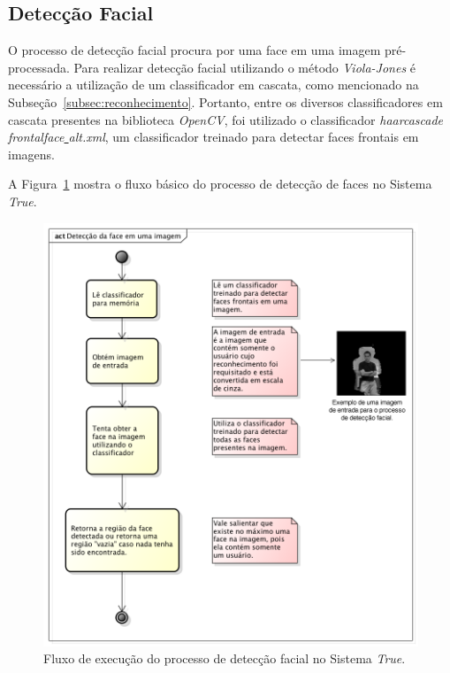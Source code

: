 	\subsection{Detecção Facial}

		O processo de detecção facial procura por uma face em uma imagem pré-processada. Para realizar detecção facial utilizando o método \textit{Viola-Jones} é necessário a utilização de um classificador em cascata, como mencionado na Subseção~\ref{subsec:reconhecimento}. Portanto, entre os diversos classificadores em cascata presentes na biblioteca \textit{OpenCV}, foi utilizado o classificador \textit{haarcascade\underline{ }frontalface\underline{ }alt.xml}, um classificador treinado para detectar faces frontais em imagens.

		A Figura~\ref{fig:diagrama-deteccao} mostra o fluxo básico do processo de detecção de faces no Sistema \textit{True}.

			\begin{figure}[H]
			\begin{center}
				\includegraphics[scale=0.7]{figuras/4.ProblemaEProposta/diagrama-detectar-face.png}
			\end{center}
			\caption{Fluxo de execução do processo de detecção facial no Sistema \textit{True}.}
			\label{fig:diagrama-deteccao}
		\end{figure}

